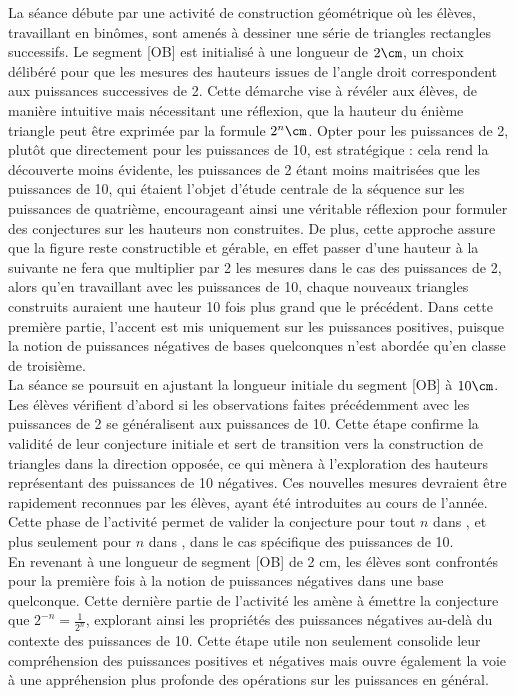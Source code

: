 La séance débute par une activité de construction géométrique où les élèves,
travaillant en binômes,
sont amenés à dessiner une série de triangles rectangles successifs.
Le segment [OB] est initialisé à une longueur de $2\cm$,
un choix délibéré pour que les mesures des hauteurs issues de l'angle droit correspondent aux puissances successives de 2.
Cette démarche vise à révéler aux élèves,
de manière intuitive mais nécessitant une réflexion,
que la hauteur du énième triangle peut être exprimée par la formule $2^n\cm$.
Opter pour les puissances de 2,
plutôt que directement pour les puissances de 10,
est stratégique :
cela rend la découverte moins évidente,
les puissances de 2 étant moins maitrisées que les puissances de 10,
qui étaient l'objet d'étude centrale de la séquence sur les puissances de quatrième,
encourageant ainsi une véritable réflexion pour formuler des conjectures sur les hauteurs non construites.
De plus,
cette approche assure que la figure reste constructible et gérable,
en effet passer d'une hauteur à la suivante ne fera que multiplier par 2 les mesures dans le cas des puissances de 2,
alors qu'en travaillant avec les puissances de 10, chaque nouveaux triangles construits auraient une hauteur 10 fois plus grand que le précédent.
Dans cette première partie,
l'accent est mis uniquement sur les puissances positives,
puisque la notion de puissances négatives de bases quelconques n'est abordée qu'en classe de troisième.\\

La séance se poursuit en ajustant la longueur initiale du segment [OB] à $10\cm$.
Les élèves vérifient d'abord si les observations faites précédemment avec les puissances de 2 se généralisent aux puissances de 10.
Cette étape confirme la validité de leur conjecture initiale et sert de transition vers la construction de triangles dans la direction opposée,
ce qui mènera à l'exploration des hauteurs représentant des puissances de 10 négatives.
Ces nouvelles mesures devraient être rapidement reconnues par les élèves,
ayant été introduites au cours de l'année.
Cette phase de l'activité permet de valider la conjecture pour tout $n$ dans ,
et plus seulement pour $n$ dans ,
dans le cas spécifique des puissances de 10.\\

En revenant à une longueur de segment [OB] de 2 cm,
les élèves sont confrontés pour la première fois à la notion de puissances négatives dans une base quelconque.
Cette dernière partie de l'activité les amène à émettre la conjecture que $2^{-n}=\frac{1}{2^n}$,
explorant ainsi les propriétés des puissances négatives au-delà du contexte des puissances de 10.
Cette étape utile non seulement consolide leur compréhension des puissances positives et négatives mais ouvre également la voie à une appréhension plus profonde des opérations sur les puissances en général.


